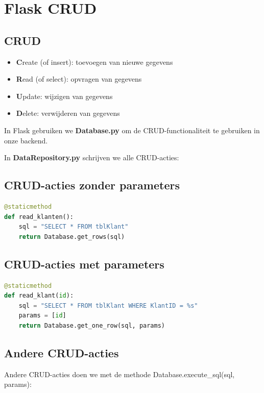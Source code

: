 \documentclass{article}
\newcommand{\bold}[1]{\textbf{#1}}
\begin{document}
\section{Flask CRUD}

\subsection{CRUD}
\begin{itemize}
    \item \bold{C}reate (of insert): toevoegen van nieuwe gegevens
    \item \bold{R}ead (of select): opvragen van gegevens
    \item \bold{U}pdate: wijzigen van gegevens
    \item \bold{D}elete: verwijderen van gegevens
\end{itemize}

In Flask gebruiken we \bold{Database.py} om de CRUD-functionaliteit te gebruiken in onze backend.

In \bold{DataRepository.py} schrijven we alle CRUD-acties:


\subsection{CRUD-acties zonder parameters}

\begin{lstlisting}[language=Python]
@staticmethod
def read_klanten():
    sql = "SELECT * FROM tblKlant"
    return Database.get_rows(sql)
\end{lstlisting}



\subsection{CRUD-acties met parameters}

\begin{lstlisting}[language=Python]
@staticmethod
def read_klant(id):
    sql = "SELECT * FROM tblKlant WHERE KlantID = %s"
    params = [id]
    return Database.get_one_row(sql, params)
\end{lstlisting}

\subsection{Andere CRUD-acties}
Andere CRUD-acties doen we met de methode Database.execute\_sql(sql, params):
\end{document}
